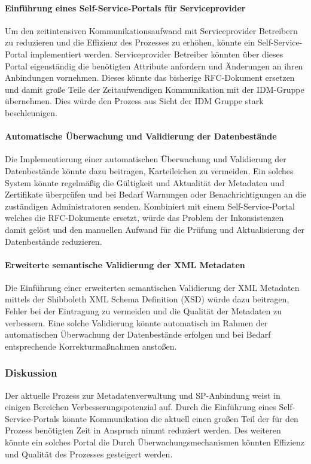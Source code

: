 \documentclass[a4paper, fontsize=11pt]{scrartcl}
\begin{document}
\paragraph{Einführung eines Self-Service-Portals für Serviceprovider}
Um den zeitintensiven Kommunikationsaufwand mit Serviceprovider Betreibern zu reduzieren und die Effizienz des Prozesses zu erhöhen, könnte ein Self-Service-Portal implementiert werden.
Serviceprovider Betreiber könnten über dieses Portal eigenständig die benötigten Attribute anfordern und Änderungen an ihren Anbindungen vornehmen.
Dieses könnte das bisherige RFC-Dokument ersetzen und damit große Teile der Zeitaufwendigen Kommunikation mit der IDM-Gruppe übernehmen. Dies würde den Prozess aus Sicht der IDM Gruppe stark beschleunigen.

\paragraph{Automatische Überwachung und Validierung der Datenbestände}
Die Implementierung einer automatischen Überwachung und Validierung der Datenbestände könnte dazu beitragen, Karteileichen zu vermeiden.
Ein solches System könnte regelmäßig die Gültigkeit und Aktualität der Metadaten und Zertifikate überprüfen und bei Bedarf Warnungen oder Benachrichtigungen an die zuständigen Administratoren senden.
Kombiniert mit einem Self-Service-Portal welches die RFC-Dokumente ersetzt, würde das Problem der Inkonsistenzen damit gelöst und den manuellen Aufwand für die Prüfung und Aktualisierung der Datenbestände reduzieren.

\paragraph{Erweiterte semantische Validierung der XML Metadaten}
Die Einführung einer erweiterten semantischen Validierung der XML Metadaten mittels der Shibboleth XML Schema Definition (XSD) würde dazu beitragen, Fehler bei der Eintragung zu vermeiden und die Qualität der Metadaten zu verbessern.
Eine solche Validierung könnte automatisch im Rahmen der automatischen Überwachung der Datenbestände erfolgen und bei Bedarf entsprechende Korrekturmaßnahmen anstoßen.

\subsubsection{Diskussion}\label{subsubsec:prozessanalyse-discussion}
Der aktuelle Prozess zur Metadatenverwaltung und SP-Anbindung weist in einigen Bereichen Verbesserungspotenzial auf.
Durch die Einführung eines Self-Service-Portals könnte Kommunikation die aktuell einen großen Teil der für den Prozess benötigten Zeit in Anspruch nimmt reduziert werden.
Des weiteren könnte ein solches Portal die 
Durch Überwachungsmechanismen könnten Effizienz und Qualität des Prozesses gesteigert werden.
\end{document}
